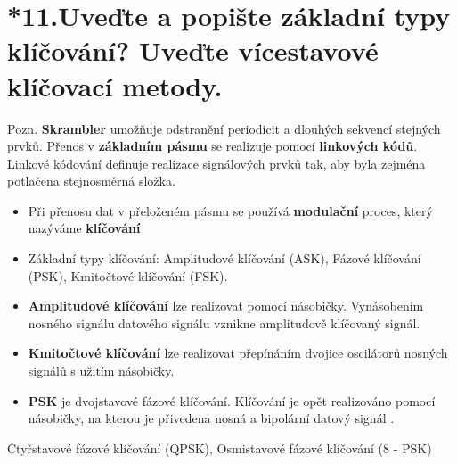 \section{*11.Uveďte a popište základní typy klíčování? Uveďte vícestavové klíčovací metody.}
Pozn. \textbf{Skrambler} umožňuje odstranění periodicit a dlouhých sekvencí stejných prvků. Přenos v \textbf{základním pásmu} se realizuje pomocí \textbf{linkových kódů}. Linkové kódování definuje realizace signálových prvků tak, aby byla zejména potlačena stejnosměrná složka.
\begin{itemize}
    \item Při přenosu dat v přeloženém pásmu se používá \textbf{modulační} proces, který nazýváme \textbf{klíčování}
    \item Základní typy klíčování: Amplitudové klíčování (ASK), Fázové klíčování (PSK), Kmitočtové klíčování (FSK).
    \item \textbf{Amplitudové klíčování} lze realizovat pomocí násobičky. Vynásobením nosného signálu datového signálu vznikne amplitudově klíčovaný signál. 
    \item \textbf{Kmitočtové klíčování} lze realizovat přepínáním dvojice oscilátorů nosných signálů s užitím násobičky.
    \item \textbf{PSK} je dvojstavové fázové klíčování. Klíčování je opět realizováno pomocí násobičky, na kterou je přivedena nosná a bipolární datový signál .
\end{itemize}
Čtyřstavové fázové klíčování (QPSK), Osmistavové fázové klíčování (8 - PSK)

